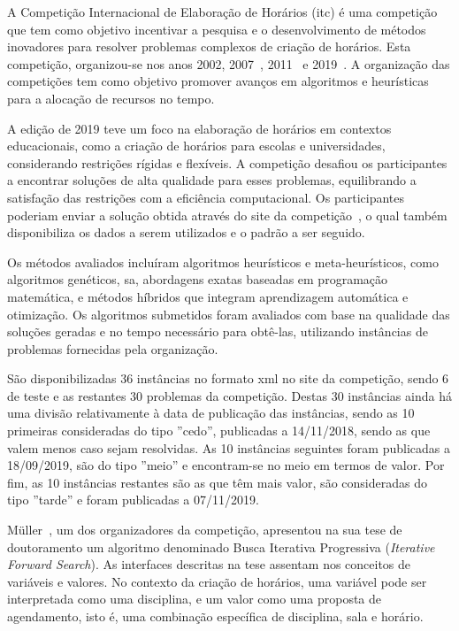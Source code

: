 A Competição Internacional de Elaboração de Horários (\gls{itc}) é uma competição que tem como objetivo incentivar a pesquisa e o desenvolvimento de métodos inovadores para resolver problemas complexos de criação de horários. Esta competição, organizou-se nos anos 2002, 2007~\cite{SecondInternationalTimetabling-Mccollum-2007}, 2011~\cite{ThirdInternationalTimetabling-Post-2013} e 2019~\cite{Realworlduniversity-Mueller-2024}. A organização das competições tem como objetivo promover avanços em algoritmos e heurísticas para a alocação de recursos no tempo.

A edição de 2019 teve um foco na elaboração de horários em contextos educacionais, como a criação de horários para escolas e universidades, considerando restrições rígidas e flexíveis. A competição desafiou os participantes a encontrar soluções de alta qualidade para esses problemas, equilibrando a satisfação das restrições com a eficiência computacional. Os participantes poderiam enviar a solução obtida através do site da competição~\cite{itc2019-Website}, o qual também disponibiliza os dados a serem utilizados e o padrão a ser seguido.

Os métodos avaliados incluíram algoritmos heurísticos e meta-heurísticos, como algoritmos genéticos, \gls{sa}, abordagens exatas baseadas em programação matemática, e métodos híbridos que integram aprendizagem automática e otimização. Os algoritmos submetidos foram avaliados com base na qualidade das soluções geradas e no tempo necessário para obtê-las, utilizando instâncias de problemas fornecidas pela organização.

São disponibilizadas 36 instâncias no formato \gls{xml} no site da competição, sendo 6 de teste e as restantes 30 problemas da competição. Destas 30 instâncias ainda há uma divisão relativamente à data de publicação das instâncias, sendo as 10 primeiras consideradas do tipo ''cedo'', publicadas a 14/11/2018, sendo as que valem menos caso sejam resolvidas. As 10 instâncias seguintes foram publicadas a 18/09/2019, são do tipo ''meio'' e encontram-se no meio em termos de valor. Por fim, as 10 instâncias restantes são as que têm mais valor, são consideradas do tipo ''tarde'' e foram publicadas a 07/11/2019.

Müller~\cite{ConstraintbasedTimetabling-Mueller}, um dos organizadores da competição, apresentou na sua tese de doutoramento um algoritmo denominado Busca Iterativa Progressiva (\textit{Iterative Forward Search}). As interfaces descritas na tese assentam nos conceitos de variáveis e valores. No contexto da criação de horários, uma variável pode ser interpretada como uma disciplina, e um valor como uma proposta de agendamento, isto é, uma combinação específica de disciplina, sala e horário. 

